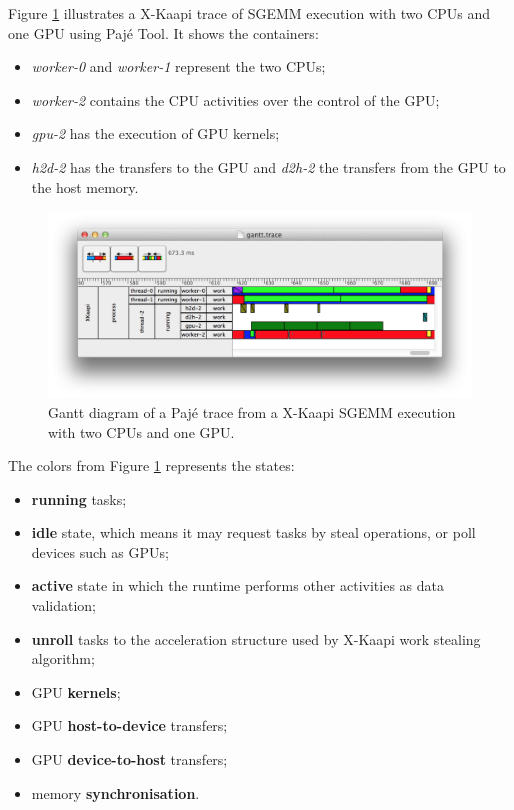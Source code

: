 \documentclass{article}[12pt]
\newcommand{\kaapi}{\textsc{X}-Kaapi\xspace}
\begin{document}
Figure \ref{fig:trace} illustrates a \kaapi trace of SGEMM execution with two CPUs and one GPU 
using Paj\'e Tool.
It shows the containers:
\begin{itemize}
\item \textit{worker-0} and \textit{worker-1} represent the two CPUs;
\item \textit{worker-2} contains the CPU activities over the control of the GPU;
\item \textit{gpu-2} has the execution of GPU kernels;
\item \textit{h2d-2} has the transfers to the GPU and \textit{d2h-2} the transfers from the GPU to the host memory.
\end{itemize}
\begin{figure}[htb]
\centering
\includegraphics[scale=0.6]{sgemm-paje-trace.png}
\caption{
Gantt diagram of a Paj\'e trace from a \kaapi SGEMM execution with two CPUs and one GPU.
}
\label{fig:trace}
\end{figure}


The colors from Figure \ref{fig:trace} represents the states:
\begin{itemize}
\item \textbf{\textcolor{running}{running}} tasks;
\item \textbf{\textcolor{idle}{idle}} state, which means it may request tasks by steal operations, or poll devices such as GPUs;
\item \textbf{\textcolor{active}{active}} state in which the runtime performs other activities as data validation;
\item \textbf{\textcolor{unroll}{unroll}} tasks to the acceleration structure used by \kaapi work stealing algorithm;
\item GPU \textbf{\textcolor{kernel}{kernels}};
\item GPU \textbf{\textcolor{host2device}{host-to-device}} transfers;
\item GPU \textbf{\textcolor{device2host}{device-to-host}} transfers;
\item memory \textbf{\textcolor{sync}{synchronisation}}.
\end{itemize}
\end{document}
